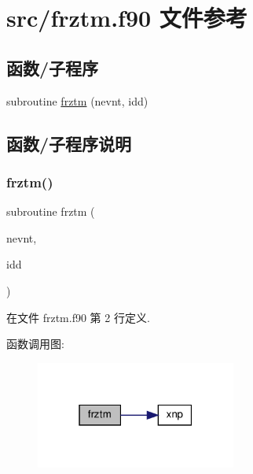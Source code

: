 \hypertarget{frztm_8f90}{}\section{src/frztm.f90 文件参考}
\label{frztm_8f90}
\subsection*{函数/子程序}
\begin{DoxyCompactItemize}
\item 
subroutine \mbox{\hyperlink{frztm_8f90_a12ee626d0ec3ee9921c258e3e6dacec9}{frztm}} (nevnt, idd)
\end{DoxyCompactItemize}


\subsection{函数/子程序说明}
\mbox{\label{frztm_8f90_a12ee626d0ec3ee9921c258e3e6dacec9}} 
\subsubsection{\texorpdfstring{frztm()}{frztm()}}
{\footnotesize\ttfamily subroutine frztm (\begin{DoxyParamCaption}\item[{}]{nevnt,  }\item[{}]{idd }\end{DoxyParamCaption})}



在文件 frztm.\+f90 第 2 行定义.

函数调用图\+:
\nopagebreak
\begin{figure}[H]
\begin{center}
\leavevmode
\includegraphics[width=187pt]{frztm_8f90_a12ee626d0ec3ee9921c258e3e6dacec9_cgraph}
\end{center}
\end{figure}
